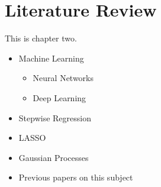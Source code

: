 
\chapter{Literature Review}

This is chapter two.

\begin{itemize}
    \item Machine Learning
    \begin{itemize}
        \item Neural Networks
        \item Deep Learning
    \end{itemize}
    \item Stepwise Regression
    \item LASSO
    \item Gaussian Processes
    \item Previous papers on this subject
\end{itemize}
